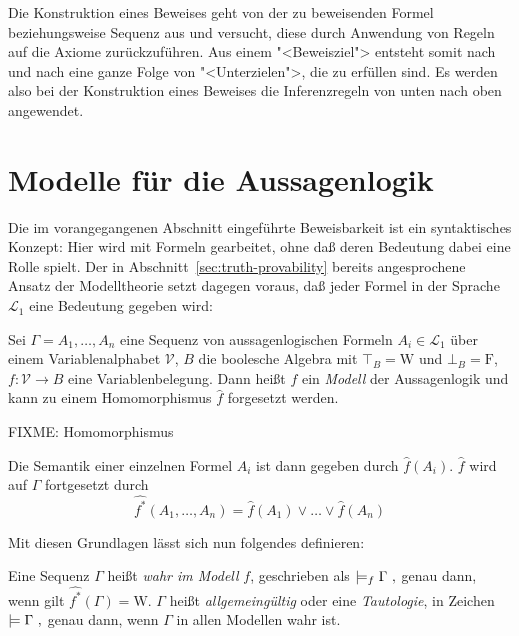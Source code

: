 Die Konstruktion eines Beweises geht
von der zu beweisenden Formel beziehungsweise Sequenz aus und
versucht, diese durch Anwendung von Regeln auf die Axiome zurückzuführen.  Aus
einem "<Beweisziel"> entsteht somit nach und nach eine ganze Folge von
"<Unterzielen">, die zu erfüllen sind.  Es werden also bei der Konstruktion eines
Beweises die Inferenzregeln von unten nach
oben angewendet.

\section{Modelle für die Aussagenlogik}
\label{sec:models}

Die im vorangegangenen Abschnitt eingeführte Beweisbarkeit ist ein
syntaktisches Konzept: Hier wird mit Formeln gearbeitet, ohne daß deren
Bedeutung dabei eine Rolle spielt.  Der in
Abschnitt~\ref{sec:truth-provability} bereits angesprochene Ansatz der
Modelltheorie setzt dagegen voraus, daß jeder
Formel in der Sprache $\mathcal{L}_1$ eine Bedeutung gegeben wird:  

\begin{definition}
  Sei $\Gamma=A_1,\ldots,A_n$ eine Sequenz von aussagenlogischen Formeln $A_i\in
  \mathcal{L}_1$ über einem Variablenalphabet
  $\mathcal{V}$, $B$ die boolesche Algebra mit $\top_B=\mathrm{W}$ und $\bot_B=\mathrm{F}$, $f:\mathcal{V}\rightarrow 
  B$ eine Variablenbelegung.  Dann heißt $f$ ein \emph{Modell} der
  Aussagenlogik und kann zu einem
  Homomorphismus $\hat{f}$ forgesetzt werden.

  FIXME: Homomorphismus

  Die Semantik einer einzelnen Formel $A_i$ ist dann gegeben
  durch $\hat{f}(A_i)$.  $\hat{f}$ wird auf $\Gamma$
  fortgesetzt durch
  \[ \widehat{\mbox{$f$}^*}(A_1,\dots,A_n) = \hat{f}(A_1)\vee\dots\vee\hat{f}(A_n)\]
\end{definition}

Mit diesen Grundlagen lässt sich nun folgendes definieren:

\begin{definition}
  Eine Sequenz $\Gamma$ heißt \emph{wahr im Modell} $f$, geschrieben
  als
%
\(
  \models_f \Gamma\ ,\index{*@$\models_f$}
\)
genau dann, wenn gilt
\(\widehat{\mbox{$f$}^*}(\Gamma) = \mathrm{W}\).
%
$\Gamma$ heißt \emph{allgemeingültig} oder eine \emph{Tautologie}, in Zeichen
%
\(
  \models \Gamma\ ,\index{*@$\models$}
\)
%
genau dann, wenn $\Gamma$ in allen Modellen wahr ist.

\end{definition}

